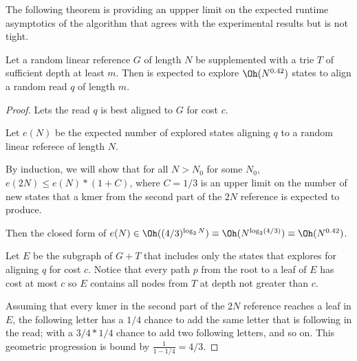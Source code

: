 The following theorem is providing an uppper limit on the expected runtime
asymptotics of the \dijkstra algorithm that agrees with the experimental results
but is not tight.

\begin{theorem}
    Let a random linear reference $G$ of length $N$ be supplemented with a trie
    $T$ of sufficient depth at least $m$. Then \dijkstra is expected to explore
    $\Oh(N^{0.42})$ states to align a random read $q$ of length $m$.
\end{theorem}
\begin{proof}
    Lets the read $q$ is best aligned to $G$ for cost $c$.

    Let $e(N)$ be the expected number of explored states aligning $q$ to a
    random linear referece of length $N$.

    By induction, we will show that for all $N>N_0$ for some $N_0$, $e(2N) \le
    e(N)*(1+C)$, where $C=1/3$ is an upper limit on the number of new states
    that a kmer from the second part of the $2N$ reference is expected to
    produce.

    
    Then the closed form of $e(N) \in \Oh((4/3)^{\log_2 N}) \equiv
    \Oh(N^{\log_2(4/3)}) \equiv \Oh(N^{0.42})$.

    Let $E$ be the subgraph of $G+T$ that includes only the states that
    \dijkstra explores for aligning $q$ for cost $c$. Notice that every path $p$
    from the root to a leaf of $E$ has cost at most $c$ so $E$ contains all
    nodes from $T$ at depth not greater than $c$.

    Assuming that every kmer in the second part of the $2N$ reference reaches a
    leaf in $E$, the following letter has a $1/4$ chance to add the same letter
    that is following in the read; with a $3/4*1/4$ chance to add two following
    letters, and so on. This geometric progression is bound by $\frac{1}{1-1/4} = 4/3$.

    
\end{proof}

